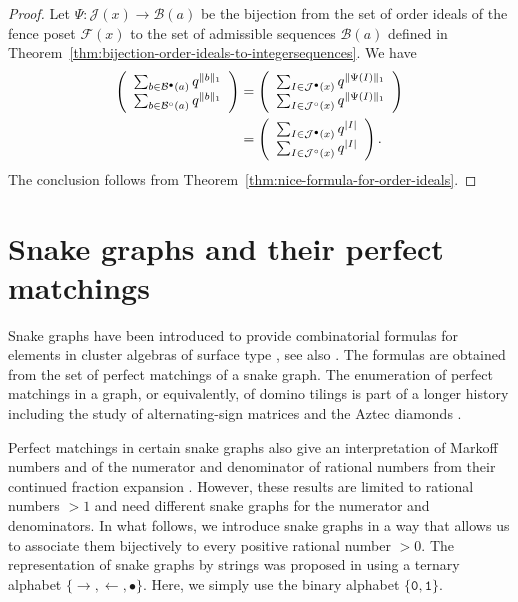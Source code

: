 \documentclass[a4paper,12pt]{amsart}
\newcommand{\xx}{{x}}
\newcommand{\Bcal}{{\mathcal{B}}}
\newcommand{\Fcal}{{\mathcal{F}}}
\newcommand{\Jcal}{{\mathcal{J}}}
\newcommand{\0}{\mathtt{0}}
\newcommand{\1}{\mathtt{1}}
\newcommand{\2}{\mathtt{2}}
\newcommand{\3}{\mathtt{3}}
\newcommand{\size}[1]{
    {|#1|}                 %
}
\begin{document}
\begin{proof}
Let $\Psi:\Jcal(\xx)\to\Bcal(a)$ be the bijection from
the set of order ideals of the fence poset $\Fcal(\xx)$
to the set of admissible sequences $\Bcal(a)$
defined in Theorem~\ref{thm:bijection-order-ideals-to-integersequences}.
%
%
%
%
%
%
We have
\begin{align*}
    \left(\begin{array}{r}
          \sum_{b\in \Bcal^\bullet(a)} q^{\Vert b\Vert_1}\\
          \sum_{b\in \Bcal^\circ  (a)} q^{\Vert b\Vert_1}
    \end{array}\right)
    &=
    \left(\begin{array}{r}
          \sum_{I\in \Jcal^\bullet(\xx)} q^{\Vert \Psi(I)\Vert_1}\\
          \sum_{I\in \Jcal^\circ  (\xx)} q^{\Vert \Psi(I)\Vert_1}
    \end{array}\right)\\
    &=
    \left(\begin{array}{r}
          \sum_{I\in \Jcal^\bullet(\xx)} q^{\size{I}}\\
          \sum_{I\in \Jcal^\circ  (\xx)} q^{\size{I}}
    \end{array}\right).
\end{align*}
The conclusion follows from
Theorem~\ref{thm:nice-formula-for-order-ideals}.
%
\end{proof}





\section{Snake graphs and their perfect matchings}
\label{sec:snake-graphs-matchings}

Snake graphs have been introduced to provide combinatorial formulas
for elements in cluster algebras of surface type
\cite{MR2661414,MR2807089,MR3034481,zbMATH06144657},
see also \cite{zbMATH07181526}.
The formulas are obtained from the set of perfect matchings
of a snake graph. The enumeration of perfect matchings in a graph,
or equivalently, of domino tilings \cite{MR2074946}
is part of a longer history including the study of
alternating-sign matrices and the Aztec diamonds \cite{zbMATH00130434}.

Perfect matchings in certain snake graphs
also give an interpretation of Markoff numbers
\cite{MR3098784} and of the numerator and denominator of rational numbers from
their continued fraction expansion \cite{MR3778183,MR4058266}.
However, these results are limited to rational numbers $>1$
and need different snake graphs for the numerator and denominators.
In what follows, we introduce snake graphs in a way that allows us to associate
them bijectively to every positive rational number $>0$.
The representation of snake graphs by strings was proposed in
\cite{zbMATH07336893} using a ternary alphabet $\{\rightarrow,\leftarrow,\bullet\}$.
Here, we simply use the binary alphabet $\{\0,\1\}$.
\end{document}
